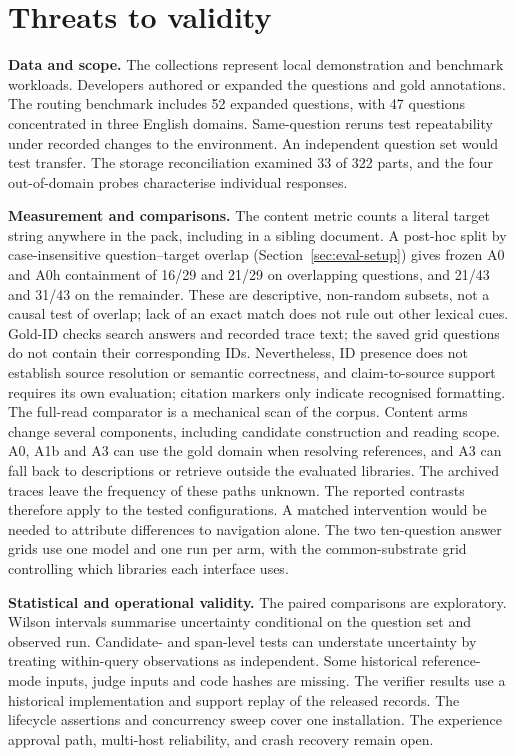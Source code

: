 \section{Threats to validity}
\label{sec:threats}

\noindent\textbf{Data and scope.} The collections represent local
demonstration and benchmark workloads. Developers authored or expanded the
questions and gold annotations. The routing benchmark includes 52 expanded
questions, with 47 questions concentrated in three English domains.
Same-question reruns test repeatability under recorded changes to the
environment. An independent question set would test transfer. The storage
reconciliation examined 33 of 322 parts, and the four out-of-domain probes
characterise individual responses.

\noindent\textbf{Measurement and comparisons.} The content metric counts a
literal target string anywhere in the pack, including in a sibling
document. A post-hoc split by case-insensitive question--target overlap
(Section~\ref{sec:eval-setup}) gives frozen A0 and A0h containment of
16/29 and 21/29 on overlapping questions, and 21/43 and 31/43 on the
remainder. These are descriptive, non-random subsets, not a causal test of
overlap; lack of an exact match does not rule out other lexical cues.
Gold-ID checks search answers and recorded trace text; the saved grid
questions do not contain their corresponding IDs. Nevertheless, ID presence
does not establish source resolution or semantic correctness, and
claim-to-source support requires its own evaluation; citation markers only
indicate recognised formatting. The full-read comparator is a mechanical
scan of the corpus. Content arms change several components, including candidate
construction and reading scope. A0, A1b and A3 can use the gold domain when
resolving references, and A3 can fall back to descriptions or retrieve
outside the evaluated libraries. The archived traces leave the frequency of
these paths unknown. The reported contrasts therefore apply to the tested
configurations. A matched intervention would be needed to attribute
differences to navigation alone. The two ten-question answer grids use one
model and one run per arm, with the common-substrate grid controlling which
libraries each interface uses.

\noindent\textbf{Statistical and operational validity.} The paired
comparisons are exploratory. Wilson intervals summarise uncertainty
conditional on the question set and observed run. Candidate- and span-level
tests can understate uncertainty by treating within-query observations as
independent. Some historical reference-mode inputs, judge inputs and code
hashes are missing. The verifier results use a historical implementation
and support replay of the released records. The lifecycle assertions and
concurrency sweep cover one installation. The experience approval path,
multi-host reliability, and crash recovery remain open.
